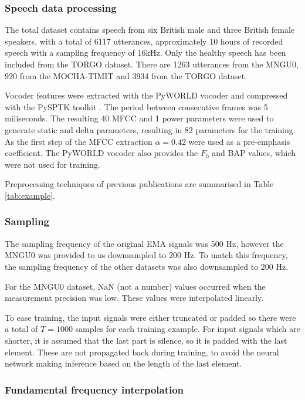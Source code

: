 \documentclass[a4paper]{article}
\begin{document}
\subsubsection{Speech data processing}


The total dataset contains speech from six British male and three British
female speakers, with a total of 6117 utterances, approximately 10 hours of recorded
speech with a sampling frequency of 16kHz.
Only the healthy speech has been included from the TORGO dataset. There are 1263 utterances from the
MNGU0, 920 from the MOCHA-TIMIT and 3934 from the TORGO dataset.

Vocoder features were extracted with the PyWORLD vocoder \cite{Morise2016}
and compressed with the PySPTK toolkit \cite{pysptk}. The period between consecutive
frames was 5 miliseconds. The resulting 40 MFCC and 1 power parameters
were used to generate static and delta parameters, resulting in 82
parameters for the training. As the first step of the MFCC extraction \( \alpha
= 0.42 \) were used as a pre-emphasis coefficient. The PyWORLD vocoder
also provides the $ F_0 $ and BAP values, which were not used for training.

Preprocessing techniques of previous publications are summarised in Table \ref{tab:example}.
\subsubsection{Sampling}

The sampling frequency of the original EMA signals was 500 Hz, however
the MNGU0 was provided to us downsampled to 200 Hz. To match this frequency,
the sampling frequency of the other datasets was also downsampled to 200 Hz.

For the MNGU0 dataset, NaN (not a number) values occurred when the measurement precision
was low. These values were interpolated linearly. 

To ease training, the input signals were either truncated or padded
so there were a total of \( T = 1000 \) samples for each training example.
For input signals which are shorter, it is assumed that the last part is
silence, so it is padded with the last element. These are not propagated back during training, to avoid the neural network making inference based on the length of the last element.

\subsubsection{Fundamental frequency interpolation}
\end{document}
